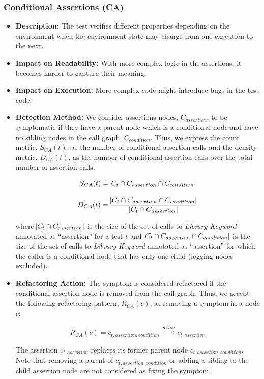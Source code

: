 \subsubsection{Conditional Assertions (CA)}

\begin{itemize}
    \item \textbf{Description:} The test verifies different properties depending on the environment when the environment state may change from one execution to the next.
    
    \item \textbf{Impact on Readability:} With more complex logic in the assertions, it becomes harder to capture their meaning.
    
    \item \textbf{Impact on Execution:} More complex code might introduce bugs in the test code.
    
    \item \textbf{Detection Method:} We consider assertions nodes, $C_{assertion}$, to be symptomatic if they have a parent node which is a conditional node and have no sibling nodes in the call graph, $C_{condition}$. Thus, we express the count metric, $S_{CA}(t)$, as the number of conditional assertion calls and the density metric, $D_{CA}(t)$, as the number of conditional assertion calls over the total number of assertion calls.

    \begin{equation*}
        S_{CA}(t) = \abs{C_{t} \cap C_{assertion} \cap C_{condition}}
    \end{equation*}
    
    \begin{equation*}
        D_{CA}(t) = \frac{\abs{C_{t} \cap C_{assertion} \cap C_{condition}}}{\abs{C_{t} \cap C_{assertion}}}
    \end{equation*}
    
    where $\abs{C_{t} \cap C_{assertion}}$ is the size of the set of calls to \emph{Library Keyword} annotated as ``assertion'' for a test $t$ and $\abs{C_{t} \cap C_{assertion} \cap C_{condition}}$  is the size of the set of calls to \emph{Library Keyword} annotated as ``assertion'' for which the caller is a conditional node that has only one child (logging nodes excluded).
    
    \item \textbf{Refactoring Action:} The symptom is considered refactored if the conditional assertion node is removed from the call graph. Thus, we accept the following refactoring pattern, $R_{CA}(c)$, as removing a symptom in a node $c$:

    \begin{equation*}
        R_{CA}(c) =  c_{t, assertion, condition} \xrightarrow{action} c_{t, assertion}
    \end{equation*}
    
    The assertion $c_{t, assertion}$ replaces its former parent node $c_{t, assertion, condition}$. Note that removing a parent of $c_{t, assertion, condition}$ or adding a sibling to the child assertion node are not considered as fixing the symptom.
\end{itemize}

